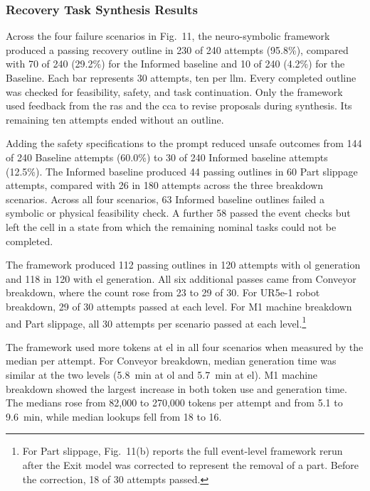 \subsubsection{Recovery Task Synthesis Results}

Across the four failure scenarios in Fig.~11, the neuro-symbolic framework
produced a passing recovery outline in 230 of 240 attempts (95.8\%), compared
with 70 of 240 (29.2\%) for the Informed baseline and 10 of 240 (4.2\%) for
the Baseline. Each bar represents 30 attempts, ten per \gls{llm}. Every
completed outline was checked for feasibility, safety, and task continuation.
Only the framework used feedback from the \glspl{ra} and the \gls{cca} to
revise proposals during synthesis. Its remaining ten attempts ended without
an outline.

Adding the safety specifications to the prompt reduced unsafe outcomes from
144 of 240 Baseline attempts (60.0\%) to 30 of 240 Informed baseline attempts
(12.5\%). The Informed baseline produced 44 passing outlines in 60 Part
slippage attempts, compared with 26 in 180 attempts across the three breakdown
scenarios. Across all four scenarios, 63 Informed baseline outlines failed a
symbolic or physical feasibility check. A further 58 passed the event checks
but left the cell in a state from which the remaining nominal tasks could not
be completed.

The framework produced 112 passing outlines in 120 attempts with \gls{ol}
generation and 118 in 120 with \gls{el} generation. All six additional passes
came from Conveyor breakdown, where the count rose from 23 to 29 of 30. For
UR5e-1 robot breakdown, 29 of 30 attempts passed at each level. For M1
machine breakdown and Part slippage, all 30 attempts per scenario passed at
each level.\footnote{For Part slippage,
Fig.~11(b) reports the full event-level framework rerun after the Exit model
was corrected to represent the removal of a part. Before the correction, 18
of 30 attempts passed.}

The framework used more tokens at \gls{el} in all four scenarios when
measured by the median per attempt. For Conveyor breakdown, median generation
time was similar at the two levels (5.8~min at \gls{ol} and 5.7~min at
\gls{el}). M1 machine breakdown showed the largest increase in both token
use and generation time. The medians rose from 82,000 to 270,000 tokens per
attempt and from 5.1 to 9.6~min, while median lookups fell from 18 to 16.
